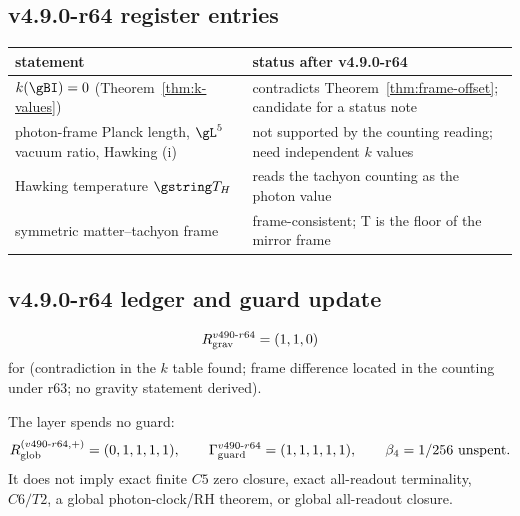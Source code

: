 \subsection*{v4.9.0-r64 register entries}
\label{subsec:v490-r64-register}

\begin{center}
\small
\begin{tabular}{@{}>{\raggedright\arraybackslash}p{}>{\raggedright\arraybackslash}p{}@{}}
\toprule
statement & status after v4.9.0-r64\\
\midrule
\(k(\gBI)=0\) (Theorem~\ref{thm:k-values}) & contradicts Theorem~\ref{thm:frame-offset}; candidate for a status note\\
photon-frame Planck length, \(\gL^5\) vacuum ratio, Hawking (i) & not supported by the counting reading; need independent \(k\) values\\
Hawking temperature \(\gstring T_H\) & reads the tachyon counting as the photon value\\
symmetric matter--tachyon frame & frame-consistent; T is the floor of the mirror frame\\
\bottomrule
\end{tabular}
\end{center}

\subsection*{v4.9.0-r64 ledger and guard update}
\label{subsec:v490-r64-ledger-guard}

\[
R_{\rm grav}^{v490\text{-}r64}=(1,1,0)
\]
for (contradiction in the \(k\) table found; frame difference located in the counting under r63; no gravity statement derived).

The layer spends no guard:
\[
R_{\rm glob}^{(v490\text{-}r64,+)}=(0,1,1,1,1),
\qquad
\Gamma_{\rm guard}^{v490\text{-}r64}=(1,1,1,1,1),
\qquad
\beta_4=1/256\ \text{unspent}.
\]
It does not imply exact finite \(C5\) zero closure, exact all-readout terminality,
\(C6/T2\), a global photon-clock/RH theorem, or global all-readout closure.
